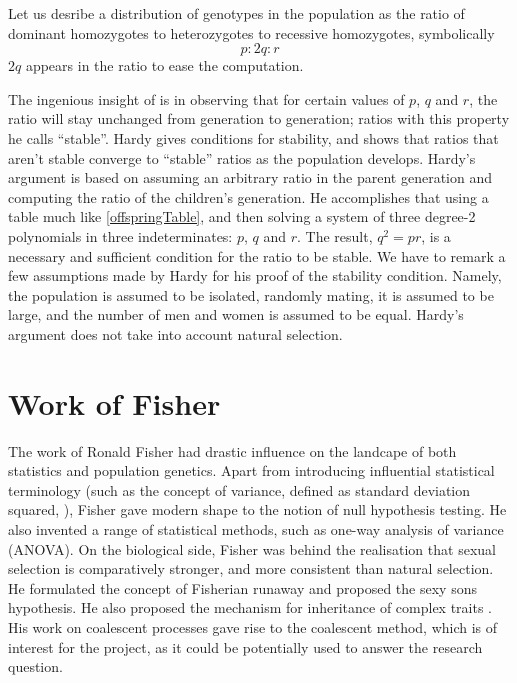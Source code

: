 \documentclass{l4proj}
\begin{document}
\begin{samepage}
Let us desribe a distribution of genotypes in the population as the ratio of dominant homozygotes to heterozygotes to recessive homozygotes, symbolically $$p:2q:r$$ $2q$ appears in the ratio to ease the computation.
\end{samepage}

The ingenious insight of \cite{hardy08} is in observing that for certain values of $p$, $q$ and $r$, the ratio will stay unchanged from generation to generation; ratios with this property he calls ``stable''. Hardy gives conditions for stability, and shows that ratios that aren't stable converge to ``stable'' ratios as the population develops. Hardy's argument is based on assuming an arbitrary ratio in the parent generation and computing the ratio of the children's generation. He accomplishes that using a table much like \ref{offspringTable}, and then solving a system of three degree-2 polynomials in three indeterminates: $p$, $q$ and $r$. The result, $q^{2}=pr$, is a necessary and sufficient condition for the ratio to be stable. We have to remark a few assumptions made by Hardy for his proof of the stability condition. Namely, the population is assumed to be isolated, randomly mating, it is assumed to be large, and the number of men and women is assumed to be equal. Hardy's argument does not take into account natural selection.

\section{Work of Fisher}

The work of Ronald Fisher had drastic influence on the landcape of both statistics and population genetics. Apart from introducing influential statistical terminology (such as the concept of variance, defined as standard deviation squared, \cite{Fisher18}), Fisher gave modern shape to the notion of null hypothesis testing. He also invented a range of statistical methods, such as one-way analysis of variance (ANOVA). On the biological side, Fisher was behind the realisation that sexual selection is comparatively stronger, and more consistent than natural selection. He formulated the concept of Fisherian runaway and proposed the sexy sons hypothesis. He also proposed the mechanism for inheritance of complex traits \parencite{Fisher18}.  His work on coalescent processes gave rise to the coalescent method, which is of interest for the project, as it could be potentially used to answer the research question.
\end{document}
